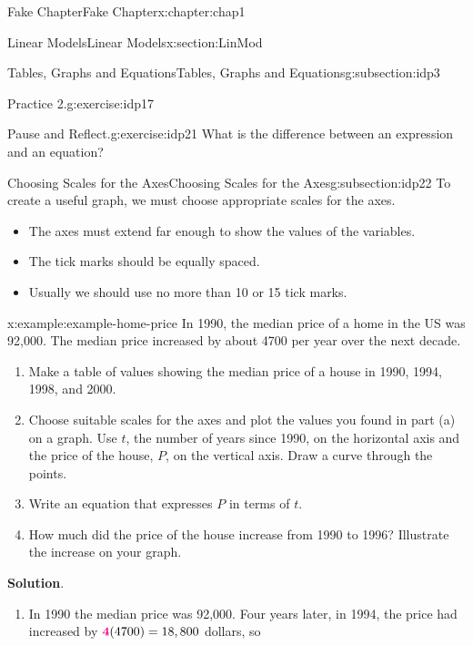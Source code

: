 \documentclass[oneside,10pt,]{book}
\newcommand{\blocktitlefont}{\relax}
\numberwithin{equation}{section}
\newcommand{\alert}[1]{\boldsymbol{\color{magenta}{#1}}}
\begin{document}
\begin{chapterptx}{Fake Chapter}{}{Fake Chapter}{}{}{x:chapter:chap1}
\begin{sectionptx}{Linear Models}{}{Linear Models}{}{}{x:section:LinMod}
\begin{subsectionptx}{Tables, Graphs and Equations}{}{Tables, Graphs and Equations}{}{}{g:subsection:idp3}
\begin{inlineexercise}{Practice 2.}{g:exercise:idp17}
\end{inlineexercise}%
\begin{inlineexercise}{Pause and Reflect.}{g:exercise:idp21}%
What is the difference between an expression and an equation?%
\end{inlineexercise}%
\end{subsectionptx}
%
%
\typeout{************************************************}
\typeout{************************************************}
%
\begin{subsectionptx}{Choosing Scales for the Axes}{}{Choosing Scales for the Axes}{}{}{g:subsection:idp22}
To create a useful graph, we must choose appropriate scales for the axes.%
\par
%
\begin{itemize}[label=\textbullet]
\item{}The axes must extend far enough to show the values of the variables.%
\item{}The tick marks should be equally spaced.%
\item{}Usually we should use no more than 10 or 15 tick marks.%
\end{itemize}
%
\begin{example}{}{x:example:example-home-price}%
In 1990, the median price of a home in the US was \textdollar{}92,000.  The median price increased by about \textdollar{}4700 per year over the next decade.%
\begin{enumerate}[label=\alph*]
\item{}Make a table of values showing the median price of a house in 1990, 1994, 1998, and 2000.%
\item{}Choose suitable scales for the axes and plot the values you found in part (a) on a graph. Use \(t\), the number of years since 1990, on the horizontal axis and the price of the house, \(P\), on the vertical axis.  Draw a curve through the points.%
\item{}Write an equation that expresses \(P\) in terms of \(t\).%
\item{}How much did the price of the house increase from 1990 to 1996?  Illustrate the increase on your graph.%
\end{enumerate}
%
\par\smallskip%
\noindent\textbf{\blocktitlefont Solution}.\hypertarget{g:solution:idp23}{}\quad{}%
\begin{enumerate}[label=\alph*]
\item{}In 1990 the median price was \textdollar{}92,000.  Four years later, in 1994, the price had increased by \(\alert{4}(4700)=18,800\) dollars, so%

\end{enumerate}
\end{example}
\end{subsectionptx}
\end{sectionptx}
\end{chapterptx}
\end{document}
